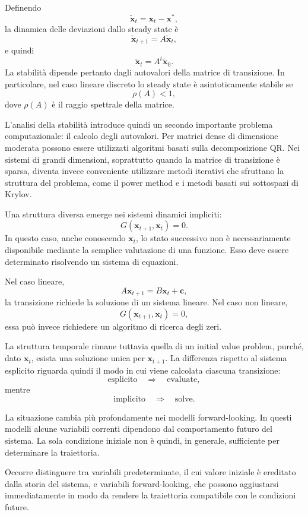 \documentclass{book}
\begin{document}
Definendo
\[
\widetilde{\mathbf{x}}_t
=
\mathbf{x}_t-\mathbf{x}^*,
\]
la dinamica delle deviazioni dallo steady state è
\[
\widetilde{\mathbf{x}}_{t+1}
=
A\widetilde{\mathbf{x}}_t,
\]
e quindi
\[
\widetilde{\mathbf{x}}_t
=
A^t\widetilde{\mathbf{x}}_0.
\]
La stabilità dipende pertanto dagli autovalori della matrice di
transizione. In particolare, nel caso lineare discreto lo steady state
è asintoticamente stabile se
\[
\rho(A)<1,
\]
dove $\rho(A)$ è il raggio spettrale della matrice.

L'analisi della stabilità introduce quindi un secondo importante
problema computazionale: il calcolo degli autovalori. Per matrici dense
di dimensione moderata possono essere utilizzati algoritmi basati sulla
decomposizione QR. Nei sistemi di grandi dimensioni, soprattutto quando
la matrice di transizione è sparsa, diventa invece conveniente
utilizzare metodi iterativi che sfruttano la struttura del problema,
come il power method e i metodi basati sui sottospazi di Krylov.

Una struttura diversa emerge nei sistemi dinamici impliciti:
\[
G(\mathbf{x}_{t+1},\mathbf{x}_t)=0.
\]
In questo caso, anche conoscendo $\mathbf{x}_t$, lo stato successivo non
è necessariamente disponibile mediante la semplice valutazione di una
funzione. Esso deve essere determinato risolvendo un sistema di
equazioni.

Nel caso lineare,
\[
A\mathbf{x}_{t+1}
=
B\mathbf{x}_t+\mathbf{c},
\]
la transizione richiede la soluzione di un sistema lineare. Nel caso
non lineare,
\[
G(\mathbf{x}_{t+1},\mathbf{x}_t)=0,
\]
essa può invece richiedere un algoritmo di ricerca degli zeri.

La struttura temporale rimane tuttavia quella di un initial value
problem, purché, dato $\mathbf{x}_t$, esista una soluzione unica per
$\mathbf{x}_{t+1}$. La differenza rispetto al sistema esplicito riguarda
quindi il modo in cui viene calcolata ciascuna transizione:
\[
\text{esplicito}
\quad\Rightarrow\quad
\text{evaluate},
\]
mentre
\[
\text{implicito}
\quad\Rightarrow\quad
\text{solve}.
\]

La situazione cambia più profondamente nei modelli forward-looking.
In questi modelli alcune variabili correnti dipendono dal comportamento
futuro del sistema. La sola condizione iniziale non è quindi, in
generale, sufficiente per determinare la traiettoria.

Occorre distinguere tra variabili predeterminate, il cui valore iniziale
è ereditato dalla storia del sistema, e variabili forward-looking, che
possono aggiustarsi immediatamente in modo da rendere la traiettoria
compatibile con le condizioni future.
\end{document}
